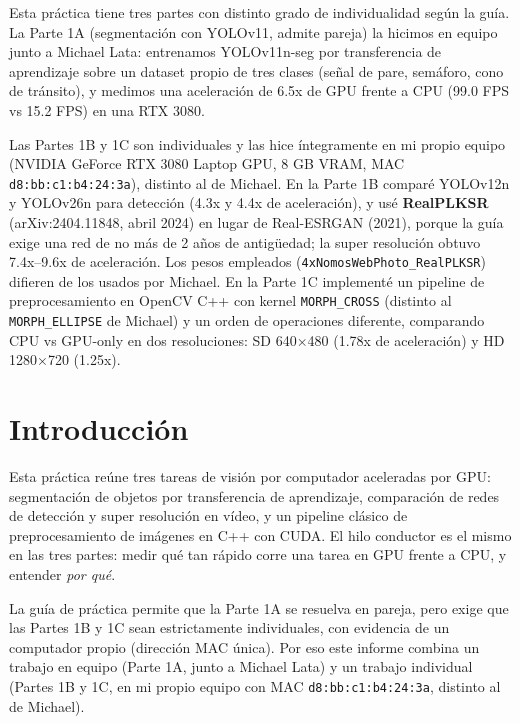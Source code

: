 \documentclass[12pt,a4paper]{article}
\begin{document}
Esta práctica tiene tres partes con distinto grado de individualidad según la guía. La Parte 1A (segmentación con YOLOv11, admite pareja) la hicimos en equipo junto a Michael Lata: entrenamos YOLOv11n-seg por transferencia de aprendizaje sobre un dataset propio de tres clases (señal de pare, semáforo, cono de tránsito), y medimos una aceleración de 6.5x de GPU frente a CPU (99.0 FPS vs 15.2 FPS) en una RTX 3080.

Las Partes 1B y 1C son individuales y las hice íntegramente en mi propio equipo (NVIDIA GeForce RTX 3080 Laptop GPU, 8 GB VRAM, MAC \texttt{d8:bb:c1:b4:24:3a}), distinto al de Michael. En la Parte 1B comparé YOLOv12n y YOLOv26n para detección (4.3x y 4.4x de aceleración), y usé \textbf{RealPLKSR} (arXiv:2404.11848, abril 2024) en lugar de Real-ESRGAN (2021), porque la guía exige una red de no más de 2 años de antigüedad; la super resolución obtuvo 7.4x--9.6x de aceleración. Los pesos empleados (\texttt{4xNomosWebPhoto\_RealPLKSR}) difieren de los usados por Michael. En la Parte 1C implementé un pipeline de preprocesamiento en OpenCV C++ con kernel \texttt{MORPH\_CROSS} (distinto al \texttt{MORPH\_ELLIPSE} de Michael) y un orden de operaciones diferente, comparando CPU vs GPU-only en dos resoluciones: SD 640×480 (1.78x de aceleración) y HD 1280×720 (1.25x).

\clearpage
\tableofcontents
\clearpage

\section{Introducción}

Esta práctica reúne tres tareas de visión por computador aceleradas por GPU: segmentación de objetos por transferencia de aprendizaje, comparación de redes de detección y super resolución en vídeo, y un pipeline clásico de preprocesamiento de imágenes en C++ con CUDA. El hilo conductor es el mismo en las tres partes: medir qué tan rápido corre una tarea en GPU frente a CPU, y entender \emph{por qué}.

La guía de práctica permite que la Parte 1A se resuelva en pareja, pero exige que las Partes 1B y 1C sean estrictamente individuales, con evidencia de un computador propio (dirección MAC única). Por eso este informe combina un trabajo en equipo (Parte 1A, junto a Michael Lata) y un trabajo individual (Partes 1B y 1C, en mi propio equipo con MAC \texttt{d8:bb:c1:b4:24:3a}, distinto al de Michael).
\end{document}
